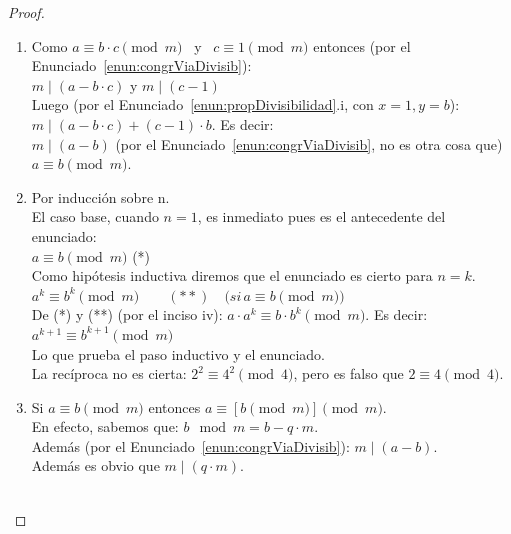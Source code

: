 \begin{proof}
\begin{enumerate}[label=\roman*)]
Inversamente:\\
Si $x \equiv y \pmod  {\frac{m}{d}}$, entonces (por el Enunciado~\ref{enun:congrViaDivisib}): $\frac{m}{d} \mid(x-y)$. Es decir:\\
$(x-y)=k \cdot \frac{m}{d}$. Luego (multiplicando ambos miembros por a ):\\
$a \cdot(x-y)=k \cdot \frac{a}{d} \cdot m$. Es decir: $a \cdot x-a \cdot y=(k \cdot \frac{a}{d}) \cdot m$. De donde se deduce que:\\
$m \mid  a \cdot x-a \cdot y$. Y por lo tanto (Enunciado~\ref{enun:congrViaDivisib}): $a \cdot x \equiv a \cdot y \pmod  m$. 
\item Como $a \equiv b \cdot c \pmod  m$ \, y \, $c \equiv 1 \pmod  m$ entonces (por el Enunciado~\ref{enun:congrViaDivisib}):\\
$m \mid (a-b \cdot c)$ y $m \mid (c-1)$\\
Luego (por el Enunciado~\ref{enun:propDivisibilidad}.i, con $x=1, y=b$): $m \mid (a-b \cdot c)+(c-1) \cdot b$. Es decir:\\
$m \mid (a-b)$ (por el Enunciado~\ref{enun:congrViaDivisib}, no es otra cosa que)\\
$a \equiv b \pmod  m$.
\item Por inducción sobre n. \\
El caso base, cuando $n=1$, es inmediato pues es el antecedente del enunciado: \\
$a \equiv b \pmod  m$ \quad\quad (*) \\
Como hipótesis inductiva diremos que el enunciado es cierto para $n=k$.\\
$a^{k} \equiv b^{k} \pmod  m \quad\quad(**) \quad(si $$\, a \equiv b \pmod  m)$\\
De (*) y (**) (por el inciso iv): $a \cdot a^{k} \equiv b \cdot b^{k} \pmod  m$. Es decir:\\
$a^{k+1} \equiv b^{k+1} \pmod  m$\\
Lo que prueba el paso inductivo y el enunciado.\\
La recíproca no es cierta: $2^{2} \equiv 4^{2} \pmod  4$, pero es falso que $2 \equiv 4 \pmod  4$.
\item Si $a \equiv b \pmod  m$ entonces $a \equiv[b \pmod m] \pmod  m$. \\
En efecto, sabemos que: $b \mod m=b-q \cdot m$.\\
Además (por el Enunciado~\ref{enun:congrViaDivisib}): $m \mid (a-b)$. \\
Además es obvio que $m \mid  (q \cdot m)$. \\
$$
\end{enumerate}
\end{proof}
